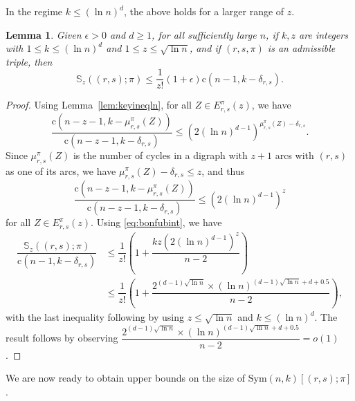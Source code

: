 \documentclass{amsart}
\newtheorem{lem}[thm]{Lemma}
\newcommand{\bb}{\mathbb}
\newcommand{\sym}{\mathrm{Sym}}
\newcommand{\st}{\mathrm{c}}
\begin{document}
In the regime $k\leq (\ln n)^{d}$, the above holds for a larger range of $z$.
\begin{lem}\label{lem:bonflnub}
Given $\epsilon>0$ and $d\geq1$, for all sufficiently large $n$, if $k,z$ are integers with $1\leq k\leq (\ln n)^{d}$ and $1\leq z\leq \sqrt{\ln n}$, and if $(r,s,\pi)$ is an admissible triple, then
\[\bb{S}_{z}((r,s);\pi) \leq \dfrac{1}{z!} ( 1+\epsilon)\st(n-1,k-\delta_{r,s}).\]
\end{lem}
\begin{proof}
Using Lemma~\ref{lem:keyineqln}, for all $Z \in E_{r,s}^{\pi}(z)$, we have 
\[\dfrac{\st(n-z-1,k-\mu_{r,s}^{\pi}(Z))}{\st(n-z-1,k-\delta_{r,s})} \leq \left(2(\ln n)^{d-1}\right)^{\mu_{r,s}^{\pi}(Z)-\delta_{r,s}}.\]
Since $\mu_{r,s}^{\pi}(Z)$ is the number of cycles in a digraph with $z+1$ arcs with $(r,s)$ as one of its arcs, we have $\mu_{r,s}^{\pi}(Z)-\delta_{r,s}\leq z$, and thus  
\[\dfrac{\st(n-z-1,k-\mu_{r,s}^{\pi}(Z))}{\st(n-z-1,k-\delta_{r,s})}\leq \left(2(\ln n)^{d-1}\right)^{z}\] for all $Z\in E_{r,s}^{\pi}(z)$. Using \eqref{eq:bonfubint}, we have
\begin{align*}
\dfrac{\bb{S}_{z}((r,s);\pi)}{\st(n-1,k-\delta_{r,s})}&\leq \dfrac{1}{z!}\left(1 + \dfrac{kz\left(2(\ln n)^{d-1}\right)^{z}}{n-2}\right)\\
& \leq \dfrac{1}{z!} \left( 1 + \dfrac{2^{(d-1)\sqrt{\ln n}}\times (\ln n )^{(d-1)\sqrt{\ln n}+d+0.5} }{n-2}  \right),
\end{align*} 
with the last inequality following by using $z\leq \sqrt{\ln n}$ and $k \leq (\ln n) ^{d}$.
The result follows by observing $\dfrac{2^{(d-1)\sqrt{\ln n}}\times (\ln n )^{(d-1)\sqrt{\ln n}+d+0.5} }{n-2}=o(1)$.
\end{proof}
We are now ready to obtain upper bounds on the size of $\sym(n,k)[(r,s);\pi]$.
\end{document}
